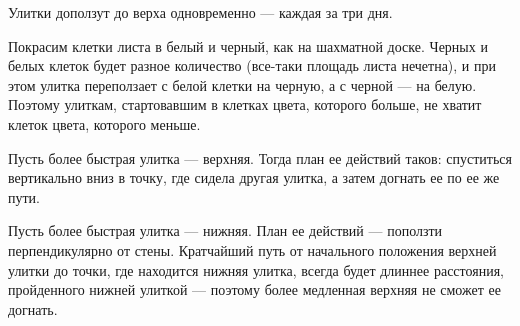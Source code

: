 ﻿
\begin{itemize}

\itA Улитки доползут до верха одновременно — каждая за три дня.

\itB Покрасим клетки листа в белый и черный, как на шахматной доске. Черных и белых клеток будет разное количество (все-таки площадь листа нечетна), и при этом улитка переползает с белой клетки на черную, а с черной — на белую. Поэтому улиткам, стартовавшим в клетках цвета, которого больше, не хватит клеток цвета, которого меньше. 

\itC Пусть более быстрая улитка — верхняя. Тогда план ее действий таков: спуститься вертикально вниз в точку, где сидела другая улитка, а затем догнать ее по ее же пути.

Пусть более быстрая улитка — нижняя. План ее действий — поползти перпендикулярно от стены. Кратчайший путь от начального положения верхней улитки до точки, где находится нижняя улитка, всегда будет длиннее расстояния, пройденного нижней улиткой — поэтому более медленная верхняя не сможет ее догнать.
\end{itemize}